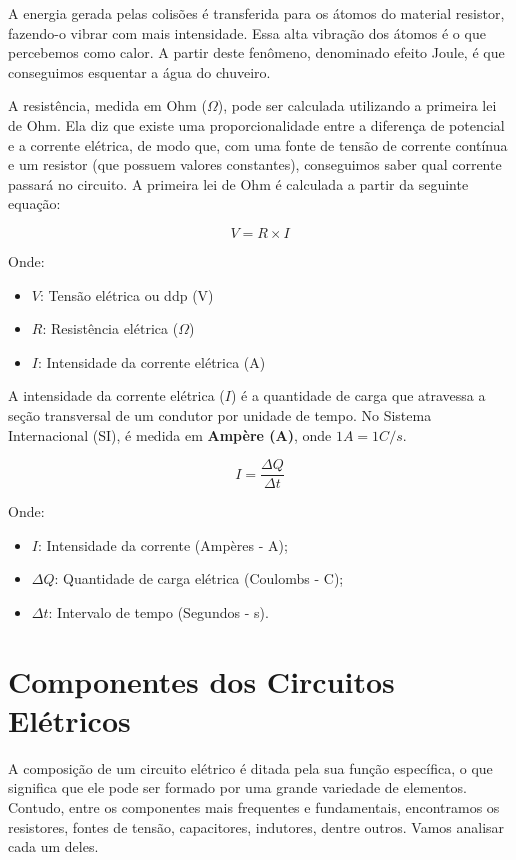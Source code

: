 \documentclass[lang=pt,11pt]{elegantbook}
\begin{document}
A energia gerada pelas colisões é transferida para os átomos do material resistor, fazendo-o vibrar com mais intensidade. Essa alta vibração dos átomos é o que percebemos como calor. A partir deste fenômeno, denominado efeito Joule, é que conseguimos esquentar a água do chuveiro.

A resistência, medida em Ohm ($\Omega$), pode ser calculada utilizando a primeira lei de Ohm. Ela diz que existe uma proporcionalidade entre a diferença de potencial e a corrente elétrica, de modo que, com uma fonte de tensão de corrente contínua e um resistor (que possuem valores constantes), conseguimos saber qual corrente passará no circuito. A primeira lei de Ohm é calculada a partir da seguinte equação:

\begin{equation}
	V = R \times I
\end{equation}

Onde:

\begin{itemize}
	\item $V$: Tensão elétrica ou ddp (V)
	\item $R$: Resistência elétrica ($\Omega$)
	\item $I$: Intensidade da corrente elétrica (A)
\end{itemize}

A intensidade da corrente elétrica ($I$) é a quantidade de carga que atravessa a seção transversal de um condutor por unidade de tempo. No Sistema Internacional (SI), é medida em \textbf{Ampère (A)}, onde $1 A = 1 C/s$.

\begin{equation}
    I = \frac{\Delta Q}{\Delta t}
\end{equation}

Onde:
\begin{itemize}
    \item $I$: Intensidade da corrente (Ampères - A);
    \item $\Delta Q$: Quantidade de carga elétrica (Coulombs - C);
    \item $\Delta t$: Intervalo de tempo (Segundos - s).
\end{itemize}

\section{Componentes dos Circuitos Elétricos}

A composição de um circuito elétrico é ditada pela sua função específica, o que significa que ele pode ser formado por uma grande variedade de elementos. Contudo, entre os componentes mais frequentes e fundamentais, encontramos os resistores, fontes de tensão, capacitores, indutores, dentre outros. Vamos analisar cada um deles.
\end{document}
